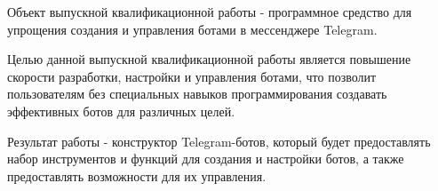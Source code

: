 

Объект выпускной квалификационной работы - программное средство для упрощения
создания и управления ботами в мессенджере Telegram.

Целью данной выпускной квалификационной работы является повышение
скорости разработки, настройки и управления
ботами, что позволит пользователям
без специальных навыков
программирования создавать
эффективных ботов для различных целей.

Результат работы - конструктор Telegram-ботов,
который будет предоставлять
набор инструментов и
функций для создания и настройки
ботов, а также предоставлять
возможности для их управления.


